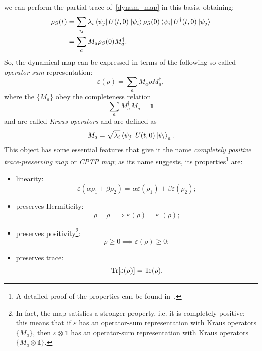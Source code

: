 we can perform the partial trace of~\ref{dynam_map} in this basis, obtaining:
\begin{equation}
\begin{split}
    \rho_S(t) &= \sum_{ij} \lambda_i \bra{\psi_j}U(t,0)\ket{\psi_i}\rho_S(0) \bra{\psi_i}U^\dagger(t,0)\ket{\psi_j}\\
                &= \sum_a M_a \rho_S(0) M_a^\dagger.
\end{split}
\end{equation}
So, the dynamical map can be expressed in terms of the following so-called \emph{operator-sum} representation:
\begin{equation}
    \varepsilon(\rho) = \sum_a M_a \rho M_a^\dagger,
\end{equation}
where the $\{M_a\}$ obey the completeness relation
\begin{equation}
\label{compl_rel_kraus}
    \sum_a M_a^\dagger M_a = \mathds{1}
\end{equation}
and are called \emph{Kraus operators} and are defined as~\cite{nielsen_chuang}
\begin{equation}
    M_a = \sqrt{\lambda_i} \bra{\psi_j}U(t,0)\ket{\psi_i}_a.
\end{equation}
This object has some essential features that give it the name \emph{completely positive trace-preserving map} or \emph{CPTP map}; as its name suggests, its properties\footnote{A detailed proof of the properties can be found in~\cite{presk:quant_info}.} are:
\begin{itemize}
    \item linearity: 
    \begin{equation*}
        \varepsilon(\alpha\rho_1 + \beta\rho_2) = \alpha\varepsilon(\rho_1) + \beta\varepsilon(\rho_2);
    \end{equation*}
    \item preserves Hermiticity: 
    \begin{equation*}
        \rho = \rho^\dagger \implies \varepsilon(\rho) = \varepsilon^\dagger(\rho);
    \end{equation*}
    \item preserves positivity\footnote{In fact, the map satisfies a stronger property, i.e. it is completely positive; this means that if $\varepsilon$ has an operator-sum representation with Kraus operators $\{M_a\}$, then $\varepsilon \otimes \mathds{1}$ has an operator-sum representation with Kraus operators $\{M_a \otimes \mathds{1}\}$.}:
    \begin{equation*}
        \rho \geq 0 \implies \varepsilon(\rho) \geq 0;
    \end{equation*}
    \item preserves trace:
    \begin{equation*}
        \operatorname{Tr} [\varepsilon(\rho)] = \operatorname{Tr} (\rho).
    \end{equation*}
\end{itemize}

